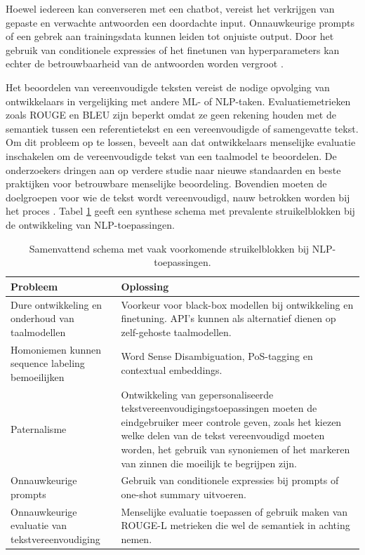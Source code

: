 \medspace

Hoewel iedereen kan converseren met een chatbot, vereist het verkrijgen van gepaste en verwachte antwoorden een doordachte input. Onnauwkeurige prompts of een gebrek aan trainingsdata kunnen leiden tot onjuiste output. Door het gebruik van conditionele expressies of het finetunen van hyperparameters kan echter de betrouwbaarheid van de antwoorden worden vergroot \autocite{Miszczak2023, Jiang2023}.

\medspace

Het beoordelen van vereenvoudigde teksten vereist de nodige opvolging van ontwikkelaars in vergelijking met andere ML- of NLP-taken. Evaluatiemetrieken zoals ROUGE en BLEU zijn beperkt omdat ze geen rekening houden met de semantiek tussen een referentietekst en een vereenvoudigde of samengevatte tekst. Om dit probleem op te lossen, beveelt \textcite{Fabbri2020} aan dat ontwikkelaars menselijke evaluatie inschakelen om de vereenvoudigde tekst van een taalmodel te beoordelen. De onderzoekers dringen aan op verdere studie naar nieuwe standaarden en beste praktijken voor betrouwbare menselijke beoordeling. Bovendien moeten de doelgroepen voor wie de tekst wordt vereenvoudigd, nauw betrokken worden bij het proces \autocite{Iskender2021}. Tabel \ref{table:summary-hurdles} geeft een synthese schema met prevalente struikelblokken bij de ontwikkeling van NLP-toepassingen.

\medspace

\begin{center}
	\begin{table}[H]
	\begin{tabular}{ m{4cm} | m{10cm} | }
		\hline
		\textbf{Probleem} & \textbf{Oplossing} \\
		\hline
		Dure ontwikkeling en onderhoud van taalmodellen & Voorkeur voor black-box modellen bij ontwikkeling en finetuning. API's kunnen als alternatief dienen op zelf-gehoste taalmodellen. \\
		\hline
		Homoniemen kunnen sequence labeling bemoeilijken & Word Sense Disambiguation, PoS-tagging en contextual embeddings. \\
		\hline
		Paternalisme & Ontwikkeling van gepersonaliseerde tekstvereenvoudigingstoepassingen moeten de eindgebruiker meer controle geven, zoals het kiezen welke delen van de tekst vereenvoudigd moeten worden, het gebruik van synoniemen of het markeren van zinnen die moeilijk te begrijpen zijn. \\
		\hline
		Onnauwkeurige prompts & Gebruik van conditionele expressies bij prompts of one-shot summary uitvoeren. \\
		\hline
		Onnauwkeurige evaluatie van tekstvereenvoudiging & Menselijke evaluatie toepassen of gebruik maken van ROUGE-L metrieken die wel de semantiek in achting nemen. 
		\hline
	\end{tabular}
	\caption{Samenvattend schema met vaak voorkomende struikelblokken bij NLP-toepassingen.}
	\label{table:summary-hurdles}
	\end{table}
\end{center}

